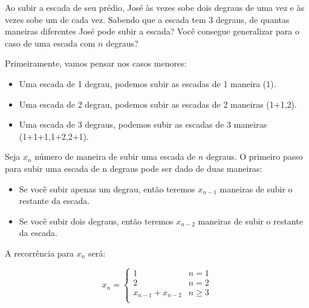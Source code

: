 \begin{exemplo}

Ao subir a escada de seu prédio, José às vezes sobe dois degraus de uma vez e às vezes sobe um de cada
vez. Sabendo que a escada tem 3 degraus, de quantas maneiras diferentes José pode subir a escada? Você
consegue generalizar para o caso de uma escada com $n$ degraus?


Primeiramente, vamos pensar nos casos menores:

\begin{itemize}
    \item Uma escada de 1 degrau, podemos subir as escadas de 1 maneira (1).
    \item Uma escada de 2 degrau, podemos subir as escadas de 2 maneiras (1+1,2).
    \item Uma escada de 3 degraus, podemos subir as escadas de 3 maneiras (1+1+1,1+2,2+1).
\end{itemize}

Seja $x_n$ número de maneira de subir uma escada de $n$ degraus.  O primeiro passo para subir uma escada de n degraus pode ser dado de duas maneiras:

\begin{itemize}
    \item Se você subir apenas um degrau, então teremos $x_{n-1}$ maneiras de subir o restante da escada.
    \item Se você subir dois degraus, então teremos $x_{n-2}$ maneiras de subir o restante da escada.
\end{itemize}

A recorrência para $x_n$ será:

$$
x_n = \begin{cases}
1 & n = 1\\
2 & n = 2\\ 
x_{n-1} + x_{n-2} & n \geq 3\\
\end{cases}
$$
\end{exemplo}

